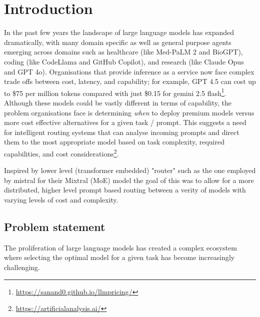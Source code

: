 \chapter{Introduction}
\label{ch:into}

In the past few years the landscape of large language models has expanded dramatically, with many domain specific as well as general purpose agents emerging across domains such as healthcare (like Med-PaLM 2 and BioGPT), coding (like CodeLlama and GitHub Copilot), and research (like Claude Opus and GPT 4o). Organisations that provide inference as a service now face complex trade offs between cost, latency, and capability; for example, GPT 4.5 can cost up to \$75 per million tokens compared with just \$0.15 for gemini 2.5 flash\footnote{\url{https://sanand0.github.io/llmpricing/}}. Although these models could be vastly different in terms of capability, the problem organisations face is determining \textit{when} to deploy premium models versus more cost effective alternatives for a given task / prompt. This suggests a need for intelligent routing systems that can analyse incoming prompts and direct them to the most appropriate model based on task complexity, required capabilities, and cost considerations\footnote{\url{https://artificialanalysis.ai/}}.

Inspired by lower level (transformer embedded) "router" such as the one employed by mistral for their Mixtral (MoE) model the goal of this was to allow for a more distributed, higher level prompt based routing between a verity of models with varying levels of cost and complexity.


\section{Problem statement}
\label{sec:intro_prob_art}

The proliferation of large language models has created a complex ecosystem where selecting the optimal model for a given task has become increasingly challenging.

